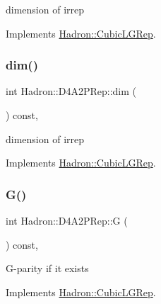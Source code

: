 dimension of irrep 

Implements \mbox{\hyperlink{structHadron_1_1CubicLGRep_a3acbaea26503ed64f20df693a48e4cdd}{Hadron\+::\+Cubic\+L\+G\+Rep}}.

\mbox{\label{structHadron_1_1D4A2PRep_ace9d2d2d6b73e3ec4de7682a8930ff1c}} 
\subsubsection{\texorpdfstring{dim()}{dim()}\hspace{0.1cm}{\footnotesize\ttfamily [2/2]}}
{\footnotesize\ttfamily int Hadron\+::\+D4\+A2\+P\+Rep\+::dim (\begin{DoxyParamCaption}{ }\end{DoxyParamCaption}) const\hspace{0.3cm}{\ttfamily [inline]}, {\ttfamily [virtual]}}

dimension of irrep 

Implements \mbox{\hyperlink{structHadron_1_1CubicLGRep_a3acbaea26503ed64f20df693a48e4cdd}{Hadron\+::\+Cubic\+L\+G\+Rep}}.

\mbox{\label{structHadron_1_1D4A2PRep_a9f96095822166d1ed6380bbeacb21938}} 
\subsubsection{\texorpdfstring{G()}{G()}\hspace{0.1cm}{\footnotesize\ttfamily [1/2]}}
{\footnotesize\ttfamily int Hadron\+::\+D4\+A2\+P\+Rep\+::G (\begin{DoxyParamCaption}{ }\end{DoxyParamCaption}) const\hspace{0.3cm}{\ttfamily [inline]}, {\ttfamily [virtual]}}

G-\/parity if it exists 

Implements \mbox{\hyperlink{structHadron_1_1CubicLGRep_ace26f7b2d55e3a668a14cb9026da5231}{Hadron\+::\+Cubic\+L\+G\+Rep}}.

\mbox{\label{structHadron_1_1D4A2PRep_a9f96095822166d1ed6380bbeacb21938}} 
